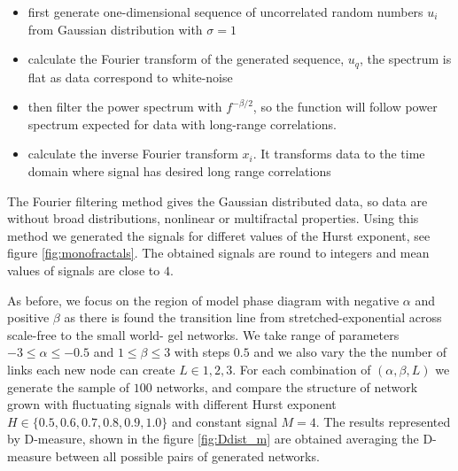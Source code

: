 \begin{itemize}
	\item first generate one-dimensional sequence of uncorrelated random numbers $u_i$ from Gaussian distribution with $\sigma=1$
	\item calculate the Fourier transform of the generated sequence, $u_q$, the spectrum is flat as data correspond to white-noise
	\item then filter the power spectrum with $f^{-\beta/2}$, so the function will follow power spectrum expected for data with long-range correlations. 	
	\item  calculate the inverse Fourier transform $x_i$. It transforms data to the time domain where signal has desired long range correlations 
	 
\end{itemize}     

The Fourier filtering method gives the Gaussian distributed data, so data are without broad distributions, nonlinear or multifractal properties. Using this method we generated the signals for differet values of the Hurst exponent, see figure \ref{fig:monofractals}. The obtained signals are round to integers and mean values of signals are close to $4$.






As before, we focus on the region of model phase diagram with negative $\alpha$ and positive $\beta$ as there is found the transition line from stretched-exponential across scale-free to the small world- gel networks. We take range of parameters  $-3\leq\alpha\leq-0.5$ and $1\leq\beta\leq3$ with steps $0.5$ and we also vary the the number of links each new node can create $L\in{1, 2, 3}$. For each combination of $(\alpha, \beta, L)$ we generate the sample of $100$ networks, and compare the structure of network grown with fluctuating signals with different Hurst exponent $H \in \{0.5, 0.6, 0.7, 0.8, 0.9, 1.0\}$ and constant signal $M=4$. The results represented by D-measure, shown in the figure \ref{fig:Ddist_m}  are obtained averaging the D-measure between all possible pairs of generated networks.   

